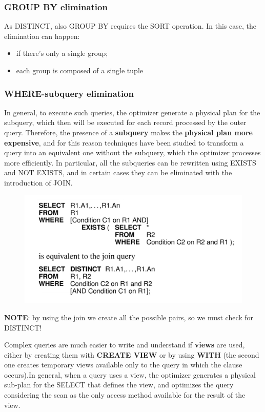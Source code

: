 \subsubsection{GROUP BY elimination}
As DISTINCT, also GROUP BY requires the SORT operation. In this case, the elimination can happen:
\begin{itemize}
    \item if there's only a single group;
    \item each group is composed of a single tuple
\end{itemize}

\subsubsection{WHERE-subquery elimination}
In general, to execute such queries, the optimizer generate a physical plan for the subquery, which then will be executed for each record processed by the outer query. Therefore, the presence of a \textbf{subquery} makes the \textbf{physical plan more expensive}, and for this reason techniques have been studied to transform a query into an equivalent one without the subquery, which the optimizer processes more efficiently. In particular, all the subqueries can be rewritten using EXISTS and NOT EXISTS, and in certain cases they can be eliminated with the introduction of JOIN.

\begin{figure}[h!]
		\centering
		\includegraphics[scale = 0.9]{img/queop5.jpg}
		\label{queop4}
\end{figure}

\textbf{NOTE}: by using the join we create all the possible pairs, so we must check for DISTINCT!

Complex queries are much easier to write and understand if \textbf{views} are used, either by creating them with \textbf{CREATE VIEW} or by using \textbf{WITH} (the second one creates temporary views available only to the query in which the clause occurs).In general, when a query uses a view, the optimizer generates a physical sub-plan for the SELECT that defines the view, and optimizes the query considering the scan as the only access method available for the result of the view.


